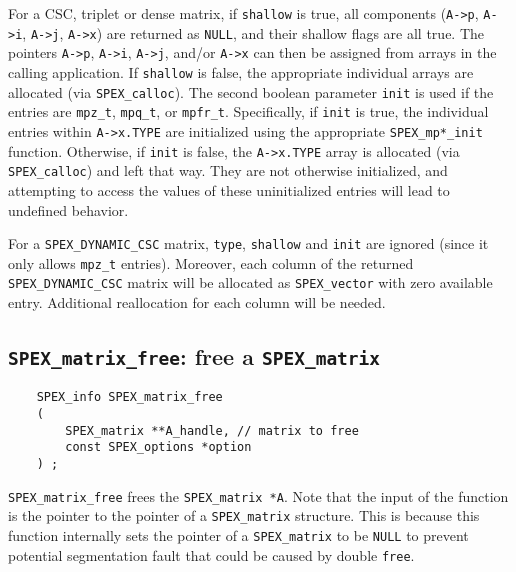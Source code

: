 \documentclass[12pt]{report}
\theoremstyle{definition}
\begin{document}
For a CSC, triplet or dense matrix, if \verb|shallow| is true, all components (\verb|A->p|, \verb|A->i|,
\verb|A->j|, \verb|A->x|) are returned as \verb|NULL|, and their shallow flags
are all true.  The pointers \verb|A->p|, \verb|A->i|, \verb|A->j|,
and/or \verb|A->x| can then be assigned from arrays in the calling application.
If \verb|shallow| is false, the appropriate individual arrays are allocated
(via \verb|SPEX_calloc|). The second boolean parameter \verb|init| is used if the entries
are \verb|mpz_t|, \verb|mpq_t|, or \verb|mpfr_t|. Specifically, if \verb|init|
is true, the individual entries within \verb|A->x.TYPE| are initialized using
the appropriate \verb|SPEX_mp*_init| function. Otherwise, if \verb|init| is
false, the \verb|A->x.TYPE| array is allocated (via \verb|SPEX_calloc|) and
left that way.  They are not otherwise initialized, and attempting to access
the values of these uninitialized entries will lead to undefined behavior.

For a \verb|SPEX_DYNAMIC_CSC| matrix, \verb|type|, \verb|shallow| and \verb|init| are ignored (since it only allows \verb|mpz_t| entries). Moreover, each column of the returned  \verb|SPEX_DYNAMIC_CSC| matrix will be
allocated as \verb|SPEX_vector| with zero available entry. Additional reallocation
for each column will be needed.


\subsection{\texttt{SPEX\_matrix\_free}: free a \texttt{SPEX\_matrix}}
\label{s:user:matrix_free}

\begin{mdframed}[userdefinedwidth=6in]
{\footnotesize
\begin{verbatim}
    SPEX_info SPEX_matrix_free
    (
        SPEX_matrix **A_handle, // matrix to free
        const SPEX_options *option
    ) ;
\end{verbatim}
} \end{mdframed}

\verb|SPEX_matrix_free| frees the \verb|SPEX_matrix *A|.  Note that the input
of the function is the pointer to the pointer of a \verb|SPEX_matrix|
structure. This is because this function internally sets the pointer of a
\verb|SPEX_matrix| to be \verb|NULL| to prevent potential segmentation fault
that could be caused by double \verb|free|.
\end{document}

